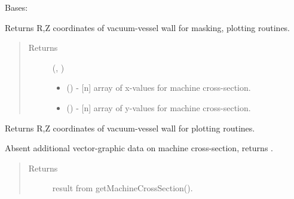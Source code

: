 \documentclass[letterpaper,10pt,english]{sphinxmanual}
\begin{document}
\begin{fulllineitems}
\label{\detokenize{eqtools:eqtools.AUGData.YGCAUGInterface}}
Bases: 

\begin{fulllineitems}
\label{\detokenize{eqtools:eqtools.AUGData.YGCAUGInterface.getMachineCrossSection}}
Returns R,Z coordinates of vacuum-vessel wall for masking, plotting
routines.
\begin{quote}\begin{description}
\item[{Returns}] \leavevmode

(, )
\begin{itemize}
\item {} 
 () - {[}n{]} array of x-values for machine cross-section.

\item {} 
 () - {[}n{]} array of y-values for machine cross-section.

\end{itemize}


\end{description}\end{quote}

\end{fulllineitems}


\begin{fulllineitems}
\label{\detokenize{eqtools:eqtools.AUGData.YGCAUGInterface.getMachineCrossSectionFull}}
Returns R,Z coordinates of vacuum-vessel wall for plotting routines.

Absent additional vector-graphic data on machine cross-section, returns
{\hyperref[\detokenize{eqtools:eqtools.AUGData.YGCAUGInterface.getMachineCrossSection}]{}}.
\begin{quote}\begin{description}
\item[{Returns}] \leavevmode
result from getMachineCrossSection().

\end{description}\end{quote}

\end{fulllineitems}


\end{fulllineitems}
\end{document}
